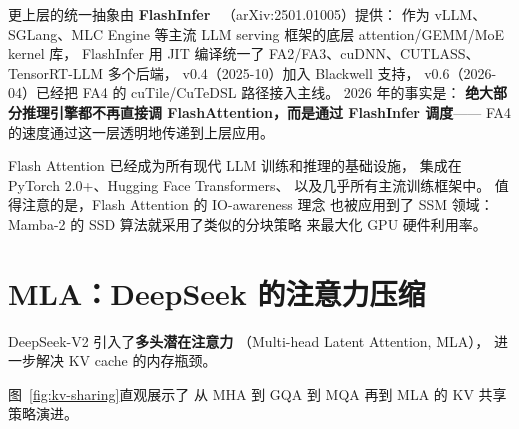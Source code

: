 更上层的统一抽象由 \textbf{FlashInfer}~\cite{ye2025flashinfer}
（arXiv:2501.01005）提供：
作为 vLLM、SGLang、MLC Engine 等主流 LLM serving 框架的底层
attention/GEMM/MoE kernel 库，
FlashInfer 用 JIT 编译统一了 FA2/FA3、cuDNN、CUTLASS、TensorRT-LLM 多个后端，
v0.4（2025-10）加入 Blackwell 支持，
v0.6（2026-04）已经把 FA4 的 cuTile/CuTeDSL 路径接入主线。
2026 年的事实是：
\textbf{绝大部分推理引擎都不再直接调 FlashAttention，而是通过 FlashInfer 调度}——
FA4 的速度通过这一层透明地传递到上层应用。

Flash Attention 已经成为所有现代 LLM 训练和推理的基础设施，
集成在 PyTorch 2.0+、Hugging Face Transformers、
以及几乎所有主流训练框架中。
值得注意的是，Flash Attention 的 IO-awareness 理念
也被应用到了 SSM 领域：
Mamba-2 的 SSD 算法就采用了类似的分块策略
来最大化 GPU 硬件利用率。

\section{MLA：DeepSeek 的注意力压缩}

DeepSeek-V2 引入了\textbf{多头潜在注意力}
（Multi-head Latent Attention, MLA），
进一步解决 KV cache 的内存瓶颈。

图~\ref{fig:kv-sharing}直观展示了
从 MHA 到 GQA 到 MQA 再到 MLA 的 KV 共享策略演进。

